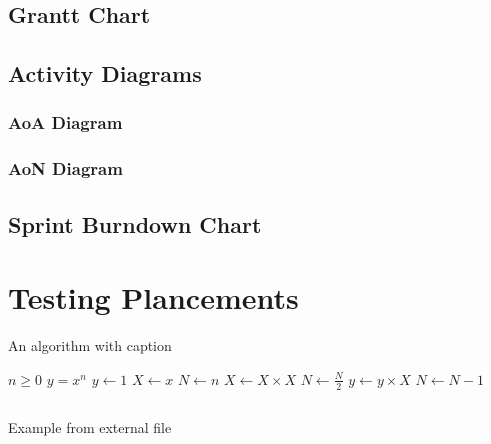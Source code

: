 \subsection{Grantt Chart}

\subsection{Activity Diagrams}

\subsubsection{AoA Diagram}

\subsubsection{AoN Diagram}

\subsection{Sprint Burndown Chart}

\section{Testing Plancements}

\begin{algorithm}[H]
\caption{An algorithm with caption}
\label{alg:cap}
\begin{algorithmic}
\Require $n \geq 0$
\Ensure $y = x^n$
\State $y \gets 1$
\State $X \gets x$
\State $N \gets n$
    \State $X \gets X \times X$
    \State $N \gets \frac{N}{2}$  
    \State $y \gets y \times X$
    \State $N \gets N - 1$
\EndIf
\EndWhile
\end{algorithmic}
\end{algorithm}

\begin{listing}[!ht]
\inputminted{python}{Chapters/chapters/Proposal/6-Work Plan/Codes/file.py}
\caption{Example from external file}
\label{listing:1}
\end{listing}

